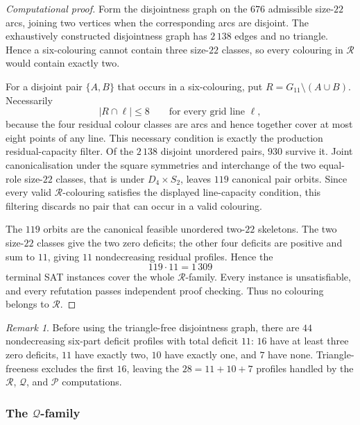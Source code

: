 \documentclass[11pt]{article}
\theoremstyle{definition}
\theoremstyle{remark}
\newtheorem{remark}[theorem]{Remark}
\newcommand{\Dfour}{D_4}
\renewcommand{\le}{\leqslant}
\begin{document}
\begin{proof}[Computational proof]
Form the disjointness graph on the \(676\) admissible size-\(22\) arcs, joining
two vertices when the corresponding arcs are disjoint.  The exhaustively
constructed disjointness graph has \(2\,138\) edges and no triangle.  Hence a six-colouring
cannot contain three size-\(22\) classes, so every colouring in \(\mathcal R\)
would contain exactly two.

For a disjoint pair \(\{A,B\}\) that occurs in a six-colouring, put
\(R=G_{11}\setminus(A\cup B)\).  Necessarily
\[
  |R\cap\ell|\le 8
  \qquad\text{for every grid line }\ell,
\]
because the four residual colour classes are arcs and hence together cover at
most eight points of any line.  This necessary condition is exactly the
production residual-capacity filter.  Of the \(2\,138\) disjoint unordered
pairs, \(930\) survive it.  Joint canonicalisation under the square symmetries
and interchange of the two equal-role size-\(22\) classes, that is under
\(\Dfour\times S_2\), leaves \(119\) canonical pair orbits.  Since every
valid \(\mathcal R\)-colouring satisfies the displayed line-capacity
condition, this filtering discards no pair that can occur in a valid
colouring.

The \(119\) orbits are the canonical feasible unordered two-\(22\)
skeletons.  The two size-\(22\) classes give the two zero deficits; the other
four deficits are positive and sum to \(11\), giving \(11\) nondecreasing
residual profiles.  Hence the
\[
  119\cdot11=1\,309
\]
terminal SAT instances cover the whole \(\mathcal R\)-family.  Every instance
is unsatisfiable, and every refutation passes independent proof checking.
Thus no colouring belongs to \(\mathcal R\).
\end{proof}

\begin{remark}\label{rem:g11-44-to-28}
Before using the triangle-free disjointness graph, there are \(44\)
nondecreasing six-part deficit profiles with total deficit \(11\): \(16\)
have at least three zero deficits, \(11\) have exactly two, \(10\) have
exactly one, and \(7\) have none.  Triangle-freeness excludes the first \(16\), leaving the
\(28=11+10+7\) profiles handled by the \(\mathcal R\), \(\mathcal Q\), and
\(\mathcal P\) computations.
\end{remark}

\subsubsection{The \texorpdfstring{\(\mathcal Q\)}{Q}-family}
\end{document}
